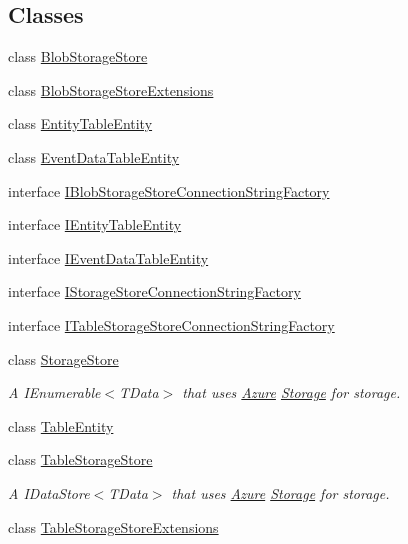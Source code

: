 \subsection*{Classes}
\begin{DoxyCompactItemize}
\item 
class \hyperlink{classCqrs_1_1Azure_1_1BlobStorage_1_1BlobStorageStore}{Blob\+Storage\+Store}
\item 
class \hyperlink{classCqrs_1_1Azure_1_1BlobStorage_1_1BlobStorageStoreExtensions}{Blob\+Storage\+Store\+Extensions}
\item 
class \hyperlink{classCqrs_1_1Azure_1_1BlobStorage_1_1EntityTableEntity}{Entity\+Table\+Entity}
\item 
class \hyperlink{classCqrs_1_1Azure_1_1BlobStorage_1_1EventDataTableEntity}{Event\+Data\+Table\+Entity}
\item 
interface \hyperlink{interfaceCqrs_1_1Azure_1_1BlobStorage_1_1IBlobStorageStoreConnectionStringFactory}{I\+Blob\+Storage\+Store\+Connection\+String\+Factory}
\item 
interface \hyperlink{interfaceCqrs_1_1Azure_1_1BlobStorage_1_1IEntityTableEntity}{I\+Entity\+Table\+Entity}
\item 
interface \hyperlink{interfaceCqrs_1_1Azure_1_1BlobStorage_1_1IEventDataTableEntity}{I\+Event\+Data\+Table\+Entity}
\item 
interface \hyperlink{interfaceCqrs_1_1Azure_1_1BlobStorage_1_1IStorageStoreConnectionStringFactory}{I\+Storage\+Store\+Connection\+String\+Factory}
\item 
interface \hyperlink{interfaceCqrs_1_1Azure_1_1BlobStorage_1_1ITableStorageStoreConnectionStringFactory}{I\+Table\+Storage\+Store\+Connection\+String\+Factory}
\item 
class \hyperlink{classCqrs_1_1Azure_1_1BlobStorage_1_1StorageStore}{Storage\+Store}
\begin{DoxyCompactList}\small\item\em A I\+Enumerable$<$\+T\+Data$>$ that uses \hyperlink{namespaceCqrs_1_1Azure}{Azure} \hyperlink{namespaceCqrs_1_1Azure_1_1Storage}{Storage} for storage. \end{DoxyCompactList}\item 
class \hyperlink{classCqrs_1_1Azure_1_1BlobStorage_1_1TableEntity}{Table\+Entity}
\item 
class \hyperlink{classCqrs_1_1Azure_1_1BlobStorage_1_1TableStorageStore}{Table\+Storage\+Store}
\begin{DoxyCompactList}\small\item\em A I\+Data\+Store$<$\+T\+Data$>$ that uses \hyperlink{namespaceCqrs_1_1Azure}{Azure} \hyperlink{namespaceCqrs_1_1Azure_1_1Storage}{Storage} for storage. \end{DoxyCompactList}\item 
class \hyperlink{classCqrs_1_1Azure_1_1BlobStorage_1_1TableStorageStoreExtensions}{Table\+Storage\+Store\+Extensions}
\end{DoxyCompactItemize}
